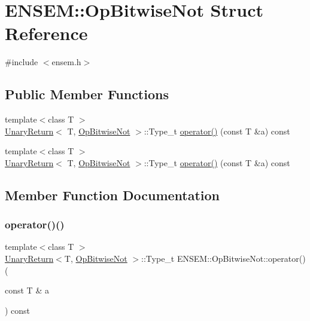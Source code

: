 \hypertarget{structENSEM_1_1OpBitwiseNot}{}\section{E\+N\+S\+EM\+:\+:Op\+Bitwise\+Not Struct Reference}
\label{structENSEM_1_1OpBitwiseNot}


{\ttfamily \#include $<$ensem.\+h$>$}

\subsection*{Public Member Functions}
\begin{DoxyCompactItemize}
\item 
{\footnotesize template$<$class T $>$ }\\\mbox{\hyperlink{structENSEM_1_1UnaryReturn}{Unary\+Return}}$<$ T, \mbox{\hyperlink{structENSEM_1_1OpBitwiseNot}{Op\+Bitwise\+Not}} $>$\+::Type\+\_\+t \mbox{\hyperlink{structENSEM_1_1OpBitwiseNot_acfac2b63c37a3d1c576ba131caf869f6}{operator()}} (const T \&a) const
\item 
{\footnotesize template$<$class T $>$ }\\\mbox{\hyperlink{structENSEM_1_1UnaryReturn}{Unary\+Return}}$<$ T, \mbox{\hyperlink{structENSEM_1_1OpBitwiseNot}{Op\+Bitwise\+Not}} $>$\+::Type\+\_\+t \mbox{\hyperlink{structENSEM_1_1OpBitwiseNot_acfac2b63c37a3d1c576ba131caf869f6}{operator()}} (const T \&a) const
\end{DoxyCompactItemize}


\subsection{Member Function Documentation}
\mbox{\label{structENSEM_1_1OpBitwiseNot_acfac2b63c37a3d1c576ba131caf869f6}} 
\subsubsection{\texorpdfstring{operator()()}{operator()()}\hspace{0.1cm}{\footnotesize\ttfamily [1/2]}}
{\footnotesize\ttfamily template$<$class T $>$ \\
\mbox{\hyperlink{structENSEM_1_1UnaryReturn}{Unary\+Return}}$<$T, \mbox{\hyperlink{structENSEM_1_1OpBitwiseNot}{Op\+Bitwise\+Not}} $>$\+::Type\+\_\+t E\+N\+S\+E\+M\+::\+Op\+Bitwise\+Not\+::operator() (\begin{DoxyParamCaption}\item[{const T \&}]{a }\end{DoxyParamCaption}) const\hspace{0.3cm}{\ttfamily [inline]}}

